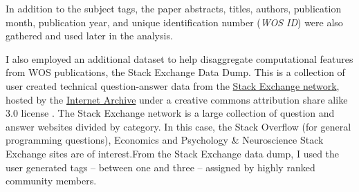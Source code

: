 \documentclass[12pt, a4paper]{article}
\begin{document}
In addition to the subject tags, the paper abstracts, titles, authors, publication month, publication year, and unique identification number (\textit{WOS ID}) were also gathered and used later in the analysis.

I also employed an additional dataset to help disaggregate computational features from WOS publications, the Stack Exchange Data Dump. This is a collection of user created technical question-answer data from the \href{http://stackexchange.com/}{Stack Exchange network}, hosted by the \href{https://archive.org/details/stackexchange}{Internet Archive} under a creative commons attribution share alike 3.0 license \citep{StackExchange}. The Stack Exchange network is a large collection of question and answer websites divided by category. In this case, the Stack Overflow (for general programming questions), Economics and Psychology \& Neuroscience Stack Exchange sites are of interest.From the Stack Exchange data dump, I used the user generated tags -- between one and three -- assigned by highly ranked community members.
\end{document}
